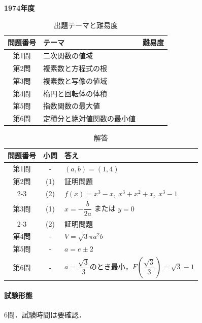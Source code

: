 \documentclass[../../main.tex]{subfiles}
\begin{document}
\begin{center}
  {\fontsize{48pt}{58pt}\selectfont \textbf{1974}\normalsize\textbf{年度}}
\end{center}

\begin{table}[htb]
  \centering
  \caption{出題テーマと難易度}
  \begin{tabular}{|c|p{9cm}|c|}
    \hline
    \textbf{問題番号} & \textbf{テーマ} & \textbf{難易度} \\
    \hline
    第1問 & 二次関数の値域 & \\
    \hline
    第2問 & 複素数と方程式の根 & \\
    \hline
    第3問 & 複素数と写像の値域 & \\
    \hline
    第4問 & 楕円と回転体の体積 & \\
    \hline
    第5問 & 指数関数の最大値 & \\
    \hline
    第6問 & 定積分と絶対値関数の最小値 & \\
    \hline
  \end{tabular}
\end{table}

\begin{table}[htb]
  \centering
  \caption{解答}
  \renewcommand{\arraystretch}{1.4}
  \begin{tabular}{|c|c|p{9cm}|}
    \hline
    \textbf{問題番号} & \textbf{小問} & \textbf{答え} \\
    \hline
    第1問 & - & $(a,b)=(1,4)$ \\
    \hline
    第2問 & (1) & 証明問題 \\
    \cline{2-3}
    & (2) & $f(x)=x^3-x,\ x^3+x^2+x,\ x^3-1$ \\
    \hline
    第3問 & (1) & $x=-\dfrac{b}{2a}$ または $y=0$ \\
    \cline{2-3}
    & (2) & 証明問題 \\
    \hline
    第4問 & - & $V=\sqrt{3}\pi a^2b$ \\
    \hline
    第5問 & - & $a=e\pm2$ \\
    \hline
    第6問 & - & $a=\dfrac{\sqrt{3}}{3}$のとき最小，$F\left(\dfrac{\sqrt{3}}{3}\right)=\sqrt{3}-1$ \\
    \hline
  \end{tabular}
\end{table}

\paragraph{試験形態}
6問．試験時間は要確認．
\end{document}
